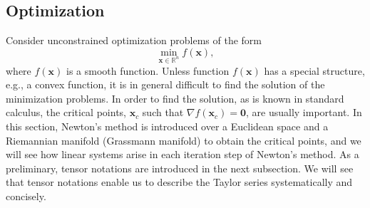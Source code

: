 \subsection{{Optimization}}\label{sec:optimization}
{Consider unconstrained optimization problems of the form}
\begin{equation}\label{eq:unconstrained-minimization}
\min_{\boldsymbol{x}\in\mathbb{R}^n}f(\boldsymbol{x}),
\end{equation}
{where $f(\boldsymbol{x})$ is a smooth function. Unless function $f(\boldsymbol{x})$ has a special structure, e.g., a convex function, it is in general difficult to find the solution of the minimization problems. In order to find the solution, as is known in standard calculus, the critical points, $\boldsymbol{x}_c$ such that $\nabla f(\boldsymbol{x}_c)=\boldsymbol{0}$, are usually important.}
{In this section, Newton's method is introduced over a Euclidean space and a Riemannian manifold (Grassmann manifold) to obtain the critical points, and we will see how linear systems arise in each iteration step of Newton's method. As a preliminary, tensor notations are introduced in the next subsection. We will see that tensor notations enable us to describe the Taylor series systematically and concisely.}
